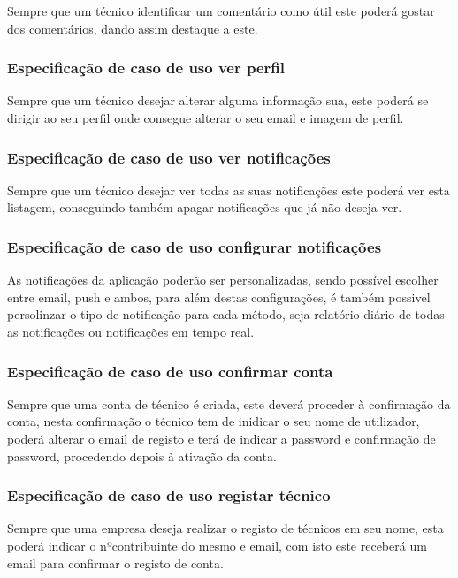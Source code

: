 Sempre que um técnico identificar um comentário como útil este poderá gostar dos comentários, dando 
assim destaque a este.



\subsubsection{Especificação de caso de uso ver perfil}

Sempre que um técnico desejar alterar alguma informação sua, este poderá se dirigir ao seu perfil onde 
consegue alterar o seu email e imagem de perfil.



\newpage

\subsubsection{Especificação de caso de uso ver notificações}

Sempre que um técnico desejar ver todas as suas notificações este poderá ver esta listagem, 
conseguindo também apagar notificações que já não deseja ver.



\subsubsection{Especificação de caso de uso configurar notificações}

As notificações da aplicação poderão ser personalizadas, sendo possível escolher entre email, push e ambos,
para além destas configurações, é também possivel persolinzar o tipo de notificação para cada método, seja 
relatório diário de todas as notificações ou notificações em tempo real.



\newpage

\subsubsection{Especificação de caso de uso confirmar conta}

Sempre que uma conta de técnico é criada, este deverá proceder à confirmação da conta, nesta confirmação
o técnico tem de inidicar o seu nome de utilizador, poderá alterar o email de registo e terá de indicar a
password e confirmação de password, procedendo depois à ativação da conta.



\subsubsection{Especificação de caso de uso registar técnico}

Sempre que uma empresa deseja realizar o registo de técnicos em seu nome, esta poderá indicar o nºcontribuinte
do mesmo e email, com isto este receberá um email para confirmar o registo de conta.

